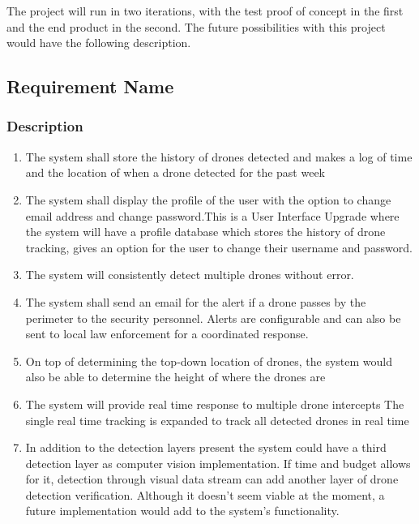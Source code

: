 The project will run in two iterations, with the test proof of concept in the first and the end product in the second. The future possibilities with this project would have the following description. 
\subsection{Requirement Name}
\subsubsection{Description}
\begin{enumerate}
  \item The system shall store the history of drones detected and makes a log of time and the location of when a drone detected for the past week
  \item The system shall display the profile of the user with the option to change email address and change password.This is a User Interface Upgrade where the system will have a profile database which stores the history of drone tracking, gives an option for the user to change their username and password.
  \item The system will consistently detect multiple drones without error.
  \item The system shall send an email for the alert if a drone passes by the perimeter to the security personnel. Alerts are configurable and can also be sent to local law enforcement for a coordinated response.
  \item On top of determining the top-down location of drones, the system would also be able to determine the height of where the drones are
  \item The system will provide real time response to multiple drone intercepts The single real time tracking is expanded to track all detected drones in real time
  \item In addition to the detection layers present the system could have a third detection layer as computer vision implementation. If time and budget allows for it, detection through visual data stream can add another layer of drone detection verification. Although it doesn't seem viable at the moment, a future implementation would add to the system's functionality.

\end{enumerate}

